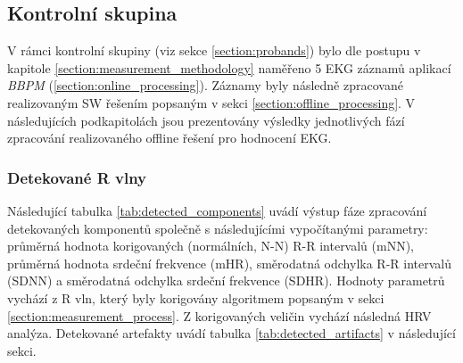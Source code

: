 \clearpage

\subsection{Kontrolní skupina}
\label{sections:results_probands}
V rámci kontrolní skupiny (viz sekce \ref{section:probands}) bylo dle postupu v
kapitole \ref{section:measurement_methodology} naměřeno 5 EKG záznamů aplikací
\textit{BBPM} (\ref{section:online_processing}). Záznamy byly následně
zpracované realizovaným SW řešením popsaným v sekci
\ref{section:offline_processing}. V následujících podkapitolách jsou
prezentovány výsledky jednotlivých fází zpracování realizovaného offline řešení
pro hodnocení EKG.

\subsubsection{Detekované R vlny}
Následující tabulka \ref{tab:detected_components} uvádí výstup fáze zpracování detekovaných komponentů společně s
následujícími vypočítanými parametry: průměrná hodnota korigovaných (normálních, N-N) R-R intervalů (mNN),
průměrná hodnota srdeční frekvence (mHR), směrodatná odchylka R-R intervalů
(SDNN) a směrodatná odchylka srdeční frekvence (SDHR). Hodnoty parametrů vychází z R vln, který byly korigovány algoritmem popsaným v sekci \ref{section:measurement_process}. Z
korigovaných veličin vychází následná HRV analýza. Detekované artefakty uvádí tabulka
\ref{tab:detected_artifacts} v následující sekci.


